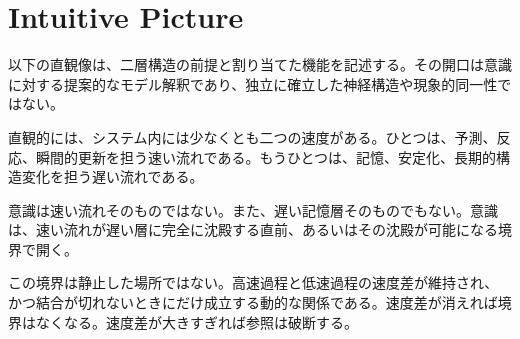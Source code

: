 \section{Intuitive Picture}

以下の直観像は、二層構造の前提と割り当てた機能を記述する。その開口は意識に対する提案的なモデル解釈であり、独立に確立した神経構造や現象的同一性ではない。


直観的には、システム内には少なくとも二つの速度がある。ひとつは、予測、反応、瞬間的更新を担う速い流れである。もうひとつは、記憶、安定化、長期的構造変化を担う遅い流れである。

意識は速い流れそのものではない。また、遅い記憶層そのものでもない。意識は、速い流れが遅い層に完全に沈殿する直前、あるいはその沈殿が可能になる境界で開く。

この境界は静止した場所ではない。高速過程と低速過程の速度差が維持され、かつ結合が切れないときにだけ成立する動的な関係である。速度差が消えれば境界はなくなる。速度差が大きすぎれば参照は破断する。
